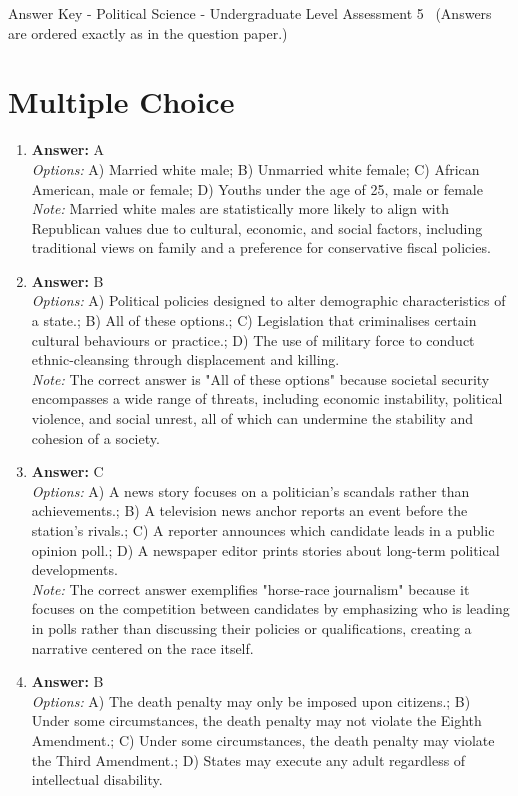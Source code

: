 \documentclass[12pt]{article}
\begin{document}
\begin{center}
Answer Key - Political Science - Undergraduate Level Assessment 5 \
\small (Answers are ordered exactly as in the question paper.)
\end{center}

\section*{Multiple Choice}
\begin{enumerate}[label=\arabic*.]
\item \textbf{Answer:} A
\\ \textit{Options:} A) Married white male; B) Unmarried white female; C) African American, male or female; D) Youths under the age of 25, male or female
\\ \textit{Note:} Married white males are statistically more likely to align with Republican values due to cultural, economic, and social factors, including traditional views on family and a preference for conservative fiscal policies.
\item \textbf{Answer:} B
\\ \textit{Options:} A) Political policies designed to alter demographic characteristics of a state.; B) All of these options.; C) Legislation that criminalises certain cultural behaviours or practice.; D) The use of military force to conduct ethnic-cleansing through displacement and killing.
\\ \textit{Note:} The correct answer is "All of these options" because societal security encompasses a wide range of threats, including economic instability, political violence, and social unrest, all of which can undermine the stability and cohesion of a society.
\item \textbf{Answer:} C
\\ \textit{Options:} A) A news story focuses on a politician's scandals rather than achievements.; B) A television news anchor reports an event before the station's rivals.; C) A reporter announces which candidate leads in a public opinion poll.; D) A newspaper editor prints stories about long-term political developments.
\\ \textit{Note:} The correct answer exemplifies "horse-race journalism" because it focuses on the competition between candidates by emphasizing who is leading in polls rather than discussing their policies or qualifications, creating a narrative centered on the race itself.
\item \textbf{Answer:} B
\\ \textit{Options:} A) The death penalty may only be imposed upon citizens.; B) Under some circumstances, the death penalty may not violate the Eighth Amendment.; C) Under some circumstances, the death penalty may violate the Third Amendment.; D) States may execute any adult regardless of intellectual disability.

\end{enumerate}
\end{document}
